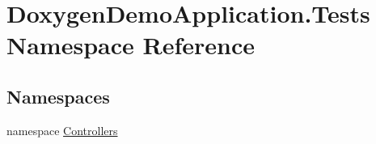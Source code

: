 \hypertarget{namespace_doxygen_demo_application_1_1_tests}{}\section{Doxygen\+Demo\+Application.\+Tests Namespace Reference}
\label{namespace_doxygen_demo_application_1_1_tests}
\subsection*{Namespaces}
\begin{DoxyCompactItemize}
\item 
namespace \mbox{\hyperlink{namespace_doxygen_demo_application_1_1_tests_1_1_controllers}{Controllers}}
\end{DoxyCompactItemize}

